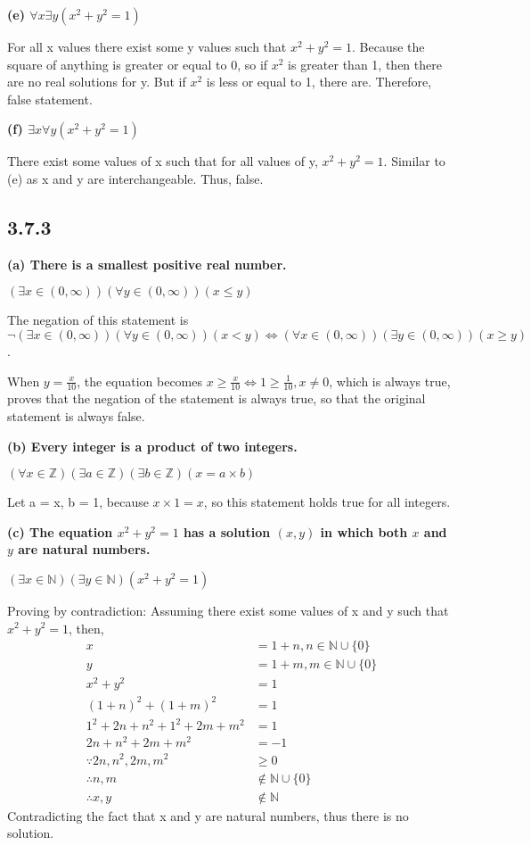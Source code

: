 \documentclass{article}
\begin{document}
\textbf{(e) $\forall x \exists y\left(x^2+y^2=1\right)$}

For all x values there exist some y values such that $x^2+y^2=1$. Because the square of anything is greater or equal to 0, so if $x^2$ is greater than 1, then there are no real solutions for y. But if $x^2$ is less or equal to 1, there are. Therefore, false statement.

\textbf{(f) $\exists x \forall y\left(x^2+y^2=1\right)$}

There exist some values of x such that for all values of y, $x^2+y^2=1$. Similar to (e) as x and y are interchangeable. Thus, false. 

\subsection*{3.7.3}

\textbf{(a) There is a smallest positive real number.}

\centerline{$(\exists x \in (0,\infty ))(\forall y \in (0,\infty ))(x\leq y)$} 

The negation of this statement is $\neg (\exists x \in (0,\infty ))(\forall y \in (0,\infty ))(x<y) \iff (\forall x \in (0,\infty ))(\exists y \in (0, \infty))(x \geq y)$.

When $y = \frac{x}{10}$, the equation becomes $x \geq \frac{x}{10} \iff 1 \geq \frac{1}{10}, x\neq 0$, which is always true, proves that the negation of the statement is always true, so that the original statement is always false.

\textbf{(b) Every integer is a product of two integers.}

\centerline{$(\forall x \in \mathbb{Z})(\exists a \in \mathbb{Z})(\exists b \in \mathbb{Z})(x=a\times b)$}

Let a = x, b = 1, because $x \times 1 = x$, so this statement holds true for all integers.

\textbf{(c) The equation $x^2+y^2=1$ has a solution $(x,y)$ in which both $x$ and $y$ are natural numbers.}

\centerline{$(\exists x \in \mathbb{N})(\exists y \in \mathbb{N})(x^2+y^2=1)$}

Proving by contradiction:
Assuming there exist some values of x and y such that $x^2+y^2=1$, then,
\begin{align*}
    x &= 1+n, n\in \mathbb{N}\cup \{0\} \\
    y &= 1+m, m\in \mathbb{N}\cup \{0\} \\
    x^2+y^2&=1 \\
    (1+n)^2 + (1+m)^2 &= 1 \\
    1^2+2n+n^2+1^2+2m+m^2 &= 1 \\
    2n+n^2+2m+m^2 &= -1 \\
    \because 2n, n^2, 2m, m^2 &\geq 0 \\
    \therefore n, m &\notin \mathbb{N}\cup \{0\} \\
    \therefore x, y &\notin \mathbb{N} 
\end{align*}
Contradicting the fact that x and y are natural numbers, thus there is no solution. 
\end{document}
